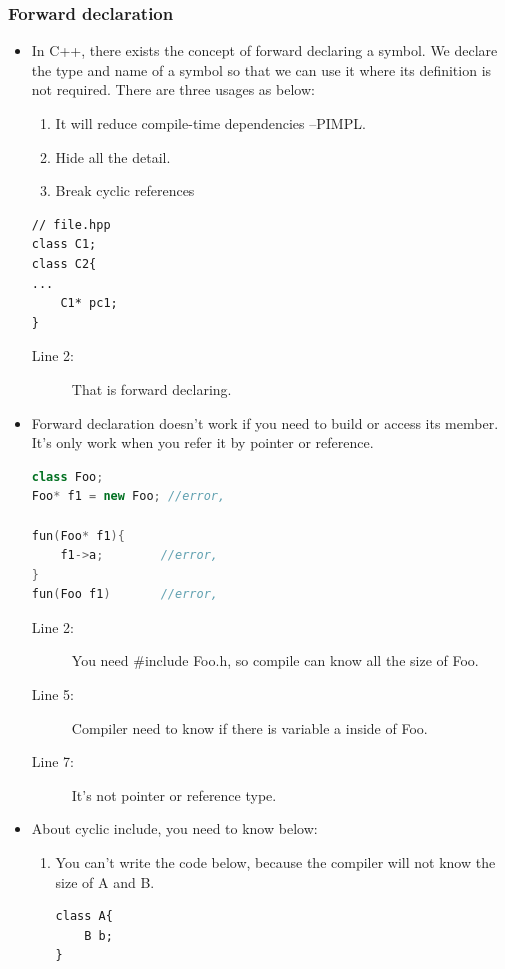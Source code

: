 \documentclass[a4paper,11pt,twoside]{book}
\begin{document}
\subsubsection{Forward declaration}
\begin{itemize}
	\item In C++, there exists the concept of forward declaring a symbol. We declare the type and name of a symbol so that we can use it where its definition is not required. There are three usages as below:
	\begin{enumerate}
		\item It will reduce compile-time dependencies --PIMPL.
		\item Hide all the detail. 
		\item Break cyclic references
	\end{enumerate}
	
\begin{lstlisting}[numbers=none]
// file.hpp
class C1;
class C2{
...
	C1* pc1;
}
\end{lstlisting}
\begin{description}
	\item[Line 2:] That is forward declaring.
\end{description}
	
	\item Forward declaration doesn't work if you need to build or access its member. It's only work when you refer it by pointer or reference.
\begin{lstlisting}[frame=single, language=c++]
class Foo; 
Foo* f1 = new Foo; //error,
	
fun(Foo* f1){
	f1->a;        //error,  
}
fun(Foo f1)       //error, 
\end{lstlisting}
\begin{description}
	\item[Line 2:]  You need \#include Foo.h, so compile can know all the size of Foo.
	
	\item [Line 5:] Compiler need to know if there is variable a inside of Foo.
	
	\item [Line 7:] It's not pointer or reference type.
\end{description}
	
	\item About cyclic include, you need to know below:
	\begin{enumerate}
		\item You can't write the code below, because the compiler will not know the size of A and B. 
\begin{lstlisting}[numbers=none]
class A{
	B b;
}


\end{lstlisting}
\end{enumerate}
\end{itemize}
\end{document}
